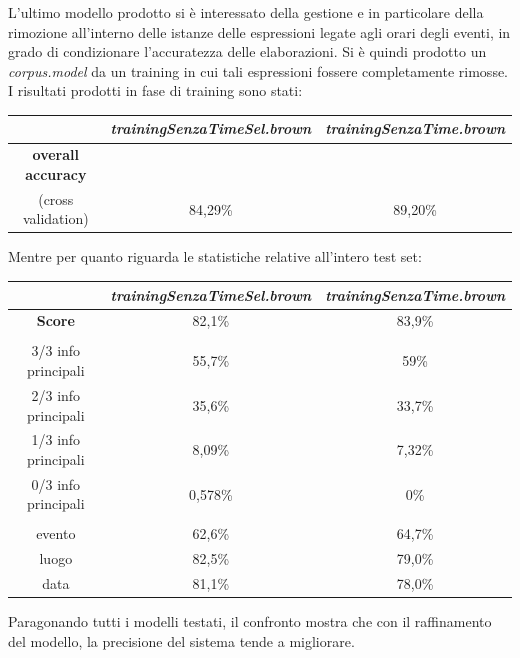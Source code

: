 \documentclass[a4paper]{report}
\begin{document}
L'ultimo modello prodotto si è interessato della gestione e in particolare della rimozione all'interno delle istanze delle espressioni legate agli orari degli eventi, in grado di condizionare l'accuratezza delle elaborazioni. Si è quindi prodotto un \textit{corpus.model} da un training in cui tali espressioni fossere completamente rimosse. I risultati prodotti in fase di training sono stati:
\begin{center}
\begin{tabular}{c c c}
\hline
 & \textit{trainingSenzaTimeSel.brown} & \textit{trainingSenzaTime.brown}\\
\hline
\textbf{overall accuracy} \\ (cross validation) & 84,29\% & 89,20\% \\
\hline
\end{tabular}
\end{center}
Mentre per quanto riguarda le statistiche relative all'intero test set:
\begin{center}
\begin{tabular}{|ccc|}
\hline
 & \textit{trainingSenzaTimeSel.brown} & \textit{trainingSenzaTime.brown}\\
\hline
\textbf{Score} & 82,1\% & 83,9\% \\
\hline
 & &  \\
\hline
3/3 info principali & 55,7\% & 59\% \\
2/3 info principali & 35,6\% & 33,7\% \\
1/3 info principali & 8,09\% & 7,32\% \\
0/3 info principali & 0,578\% & 0\% \\
\hline
 & &  \\
\hline
evento & 62,6\% & 64,7\% \\
luogo & 82,5\% & 79,0\% \\
data & 81,1\% & 78,0\% \\
\hline
\end{tabular}
\end{center}
Paragonando tutti i modelli testati, il confronto mostra che con il raffinamento del modello, la precisione del sistema tende a migliorare.
\end{document}
